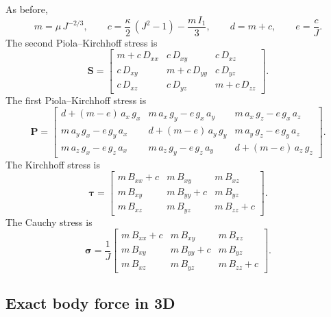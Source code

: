 \documentclass[11pt,a4paper]{article}
\begin{document}
As before,
%
\begin{equation}
m=\mu\,J^{-2/3},
\qquad
c=\dfrac{\kappa}{2}\,(J^2-1)-\dfrac{m\,I_1}{3},
\qquad
d=m+c,
\qquad
e=\dfrac{c}{J}.
\end{equation}
%
The second Piola--Kirchhoff stress is
%
\begin{equation}
\boxed{
\textbf{S}=\begin{bmatrix}
m+c\,D_{xx}&c\,D_{xy}&c\,D_{xz}\\
c\,D_{xy}&m+c\,D_{yy}&c\,D_{yz}\\
c\,D_{xz}&c\,D_{yz}&m+c\,D_{zz}
\end{bmatrix}
}.
\label{eq_S3D}
\end{equation}
%
The first Piola--Kirchhoff stress is
%
\begin{equation}
\boxed{
\textbf{P}=\begin{bmatrix}
d+(m-e)\,a_x\,g_x&m\, a_x\,g_y-e\, g_x\,a_y&m\, a_x\,g_z-e\, g_x\,a_z\\
m\, a_y\,g_x-e\, g_y\,a_x&d+(m-e)\,a_y\,g_y&m\, a_y\,g_z-e\, g_y\,a_z\\
m\, a_z\,g_x-e\, g_z\,a_x&m\, a_z\,g_y-e\, g_z\,a_y&d+(m-e)\,a_z\,g_z
\end{bmatrix}
}.
\label{eq_P3D}
\end{equation}
%
The Kirchhoff stress is
%
\begin{equation}
\boxed{
\boldsymbol{\tau}=\begin{bmatrix}
m\,B_{xx}+c&m\,B_{xy}&m\,B_{xz}\\
m\,B_{xy}&m\,B_{yy}+c&m\,B_{yz}\\
m\,B_{xz}&m\,B_{yz}&m\,B_{zz}+c
\end{bmatrix}
}.
\label{eq_tau3D}
\end{equation}
%
The Cauchy stress is
%
\begin{equation}
\boxed{
\boldsymbol{\sigma}=\dfrac1J
\begin{bmatrix}
m\,B_{xx}+c&m\,B_{xy}&m\,B_{xz}\\
m\,B_{xy}&m\,B_{yy}+c&m\,B_{yz}\\
m\,B_{xz}&m\,B_{yz}&m\,B_{zz}+c
\end{bmatrix}
}.
\label{eq_sigma3D}
\end{equation}

\subsection{Exact body force in 3D}
\end{document}
